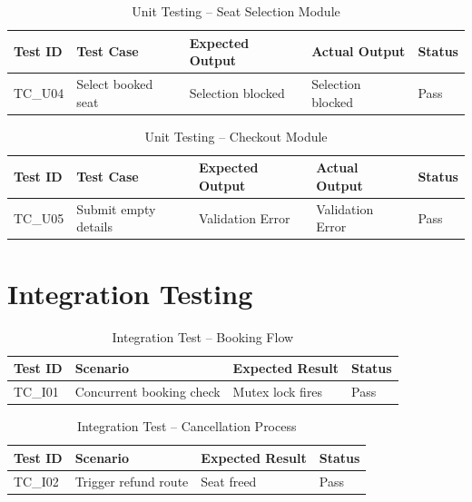 \begin{table}[H]
\centering
\begin{tabular}{|p{1.5cm}|p{4cm}|p{3.5cm}|p{3.5cm}|p{1.5cm}|}
\hline \textbf{Test ID} & \textbf{Test Case} & \textbf{Expected Output} & \textbf{Actual Output} & \textbf{Status} \\ \hline
TC\_U04 & Select booked seat & Selection blocked & Selection blocked & Pass \\ \hline
\end{tabular}
\caption{Unit Testing – Seat Selection Module}
\end{table}

\begin{table}[H]
\centering
\begin{tabular}{|p{1.5cm}|p{4cm}|p{3.5cm}|p{3.5cm}|p{1.5cm}|}
\hline \textbf{Test ID} & \textbf{Test Case} & \textbf{Expected Output} & \textbf{Actual Output} & \textbf{Status} \\ \hline
TC\_U05 & Submit empty details & Validation Error & Validation Error & Pass \\ \hline
\end{tabular}
\caption{Unit Testing – Checkout Module}
\end{table}


\section{Integration Testing}

\begin{table}[H]
\centering
\begin{tabular}{|p{1.5cm}|p{5cm}|p{4cm}|p{4cm}|}
\hline \textbf{Test ID} & \textbf{Scenario} & \textbf{Expected Result} & \textbf{Status} \\ \hline
TC\_I01 & Concurrent booking check & Mutex lock fires & Pass \\ \hline
\end{tabular}
\caption{Integration Test – Booking Flow}
\end{table}

\begin{table}[H]
\centering
\begin{tabular}{|p{1.5cm}|p{5cm}|p{4cm}|p{4cm}|}
\hline \textbf{Test ID} & \textbf{Scenario} & \textbf{Expected Result} & \textbf{Status} \\ \hline
TC\_I02 & Trigger refund route & Seat freed & Pass \\ \hline
\end{tabular}
\caption{Integration Test – Cancellation Process}
\end{table}

